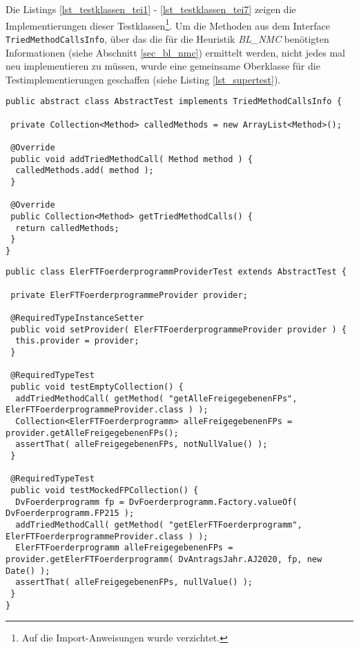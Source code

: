 Die Listings \ref{lst_testklassen_tei1} - \ref{lst_testklassen_tei7} zeigen die Implementierungen dieser Testklassen\footnote{Auf die Import-Anweisungen wurde verzichtet.}. Um die Methoden aus dem \Gls{Interface} \texttt{TriedMethodCallsInfo}, über das die für die Heuristik \emph{BL\_NMC} benötigten Informationen (siehe Abschnitt \ref{sec_bl_nmc}) ermittelt werden, nicht jedes mal neu implementieren zu müssen, wurde eine gemeinsame Oberklasse für die Testimplementierungen geschaffen (siehe Listing \ref{lst_supertest}).
\pagebreak
\begin{lstlisting}[style = java, caption = Oberklasse für die Testklassen, captionpos = b, label = lst_supertest]
public abstract class AbstractTest implements TriedMethodCallsInfo {

 private Collection<Method> calledMethods = new ArrayList<Method>();

 @Override
 public void addTriedMethodCall( Method method ) {
  calledMethods.add( method );
 }

 @Override
 public Collection<Method> getTriedMethodCalls() {
  return calledMethods;
 }
}
\end{lstlisting}
\pagebreak
\begin{lstlisting}[style = java, caption = Interface ElerFTFoerderprogrammProviderTest, captionpos = b, label = lst_testklassen_tei1]
public class ElerFTFoerderprogrammProviderTest extends AbstractTest {

 private ElerFTFoerderprogrammeProvider provider;
  
 @RequiredTypeInstanceSetter
 public void setProvider( ElerFTFoerderprogrammeProvider provider ) {
  this.provider = provider;
 }

 @RequiredTypeTest
 public void testEmptyCollection() {
  addTriedMethodCall( getMethod( "getAlleFreigegebenenFPs", ElerFTFoerderprogrammeProvider.class ) );
  Collection<ElerFTFoerderprogramm> alleFreigegebenenFPs = provider.getAlleFreigegebenenFPs();
  assertThat( alleFreigegebenenFPs, notNullValue() );
 }

 @RequiredTypeTest
 public void testMockedFPCollection() {
  DvFoerderprogramm fp = DvFoerderprogramm.Factory.valueOf( DvFoerderprogramm.FP215 );
  addTriedMethodCall( getMethod( "getElerFTFoerderprogramm", ElerFTFoerderprogrammeProvider.class ) );
  ElerFTFoerderprogramm alleFreigegebenenFPs = provider.getElerFTFoerderprogramm( DvAntragsJahr.AJ2020, fp, new Date() );
  assertThat( alleFreigegebenenFPs, nullValue() );
 }
}
\end{lstlisting}
\pagebreak
